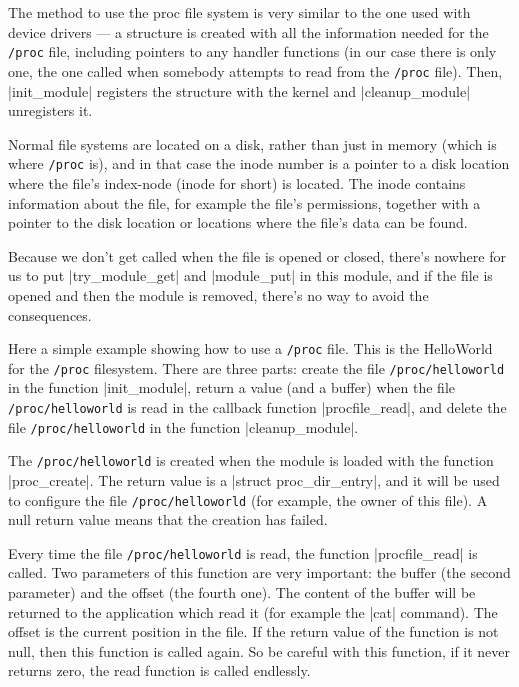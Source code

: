 \documentclass[10pt, oneside]{book}
\begin{document}
The method to use the proc file system is very similar to the one used with device drivers --- a structure is created with all the information needed for the \verb|/proc| file, including pointers to any handler functions (in our case there is only one, the one called when somebody attempts to read from the \verb|/proc| file).
Then, \cpp|init_module| registers the structure with the kernel and \cpp|cleanup_module| unregisters it.

Normal file systems are located on a disk, rather than just in memory (which is where \verb|/proc| is), and in that case the inode number is a pointer to a disk location where the file's index-node (inode for short) is located.
The inode contains information about the file, for example the file's permissions, together with a pointer to the disk location or locations where the file's data can be found.

Because we don't get called when the file is opened or closed, there's nowhere for us to put \cpp|try_module_get| and \cpp|module_put| in this module, and if the file is opened and then the module is removed, there's no way to avoid the consequences.

Here a simple example showing how to use a \verb|/proc| file.
This is the HelloWorld for the \verb|/proc| filesystem.
There are three parts: create the file \verb|/proc/helloworld| in the function \cpp|init_module|, return a value (and a buffer) when the file \verb|/proc/helloworld| is read in the callback function \cpp|procfile_read|, and delete the file \verb|/proc/helloworld| in the function \cpp|cleanup_module|.

The \verb|/proc/helloworld| is created when the module is loaded with the function \cpp|proc_create|.
The return value is a \cpp|struct proc_dir_entry|, and it will be used to configure the file \verb|/proc/helloworld| (for example, the owner of this file).
A null return value means that the creation has failed.

Every time the file \verb|/proc/helloworld| is read, the function \cpp|procfile_read| is called.
Two parameters of this function are very important: the buffer (the second parameter) and the offset (the fourth one).
The content of the buffer will be returned to the application which read it (for example the \sh|cat| command).
The offset is the current position in the file.
If the return value of the function is not null, then this function is called again.
So be careful with this function, if it never returns zero, the read function is called endlessly.
\end{document}
